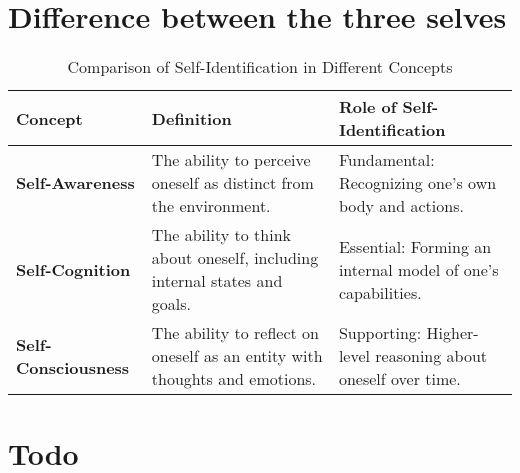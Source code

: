 \section{Difference between the three selves}
\begin{table}[h!]
    \centering
    \begin{tabular}{|l|l|l|}
        \hline
        \textbf{Concept}
        & \textbf{Definition}
        & \textbf{Role of Self-Identification} \\ \hline
        \textbf{Self-Awareness}
        & The ability to perceive oneself as distinct from the environment.
        & Fundamental: Recognizing one’s own body and actions. \\ \hline
        \textbf{Self-Cognition}
        & The ability to think about oneself, including internal states and goals.
        & Essential: Forming an internal model of one’s capabilities. \\ \hline
        \textbf{Self-Consciousness}
        & The ability to reflect on oneself as an entity with thoughts and emotions.
        & Supporting: Higher-level reasoning about oneself over time. \\ \hline
    \end{tabular}
    \caption{Comparison of Self-Identification in Different Concepts}
\end{table}


\section{Todo}
